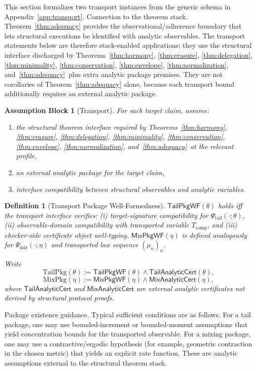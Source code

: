 \documentclass[a4paper,10pt,twocolumn,english]{article}
\numberwithin{equation}{section}
\theoremstyle{paperdef}
\newtheorem{definition}{Definition}[section]
\theoremstyle{paperplain}
\theoremstyle{paperdef}
\theoremstyle{paperremark}
\theoremstyle{paperdef}
\newtheorem{assumptions}[assumption]{Assumption Block}
\newcommand{\ABHStack}{Theorems~\ref{thm:harmony}, \ref{thm:erasure}, \ref{thm:delegation}, \ref{thm:minimality}, \ref{thm:conservation}, \ref{thm:envelope}, \ref{thm:normalization}, and~\ref{thm:adequacy}}
\begin{document}
This section formalizes two transport instances from the generic schema in Appendix~\ref{app:transport}.
Connection to the theorem stack. Theorem~\ref{thm:adequacy} provides the
observational/adherence boundary that lets structural executions be identified
with analytic observables. The transport statements below are therefore
stack-enabled applications: they use the structural interface discharged by
\ABHStack\ plus extra analytic package premises.
They are not corollaries of Theorem~\ref{thm:adequacy} alone, because each
transport bound additionally requires an external analytic package.

\begin{assumptions}[Transport]
	\label{assump:p3-transport}
	For each target claim, assume:
	\begin{enumerate}
		\item the structural theorem interface required by \ABHStack\ at the relevant profile,
		\item an external analytic package for the target claim,
		\item interface compatibility between structural observables and analytic variables.
	\end{enumerate}
\end{assumptions}

\begin{definition}[Transport Package Well-Formedness]
	\label{def:p3-transport-pkg-wf}
	$\mathsf{TailPkgWF}(\theta)$ holds iff the transport interface verifies:
	(i) target-signature compatibility for $\Psi_{\mathrm{tail}}(\cdot;\theta)$,
	(ii) observable-domain compatibility with transported variable
	$T_{\mathrm{comp}}$, and (iii) checker-side certificate object well-typing.
	$\mathsf{MixPkgWF}(\eta)$ is defined analogously for
	$\Psi_{\mathrm{mix}}(\cdot;\eta)$ and transported law sequence $(\mu_n)_n$.

	Write
	\[
		\mathrm{TailPkg}(\theta) := \mathsf{TailPkgWF}(\theta)\land \mathsf{TailAnalyticCert}(\theta),
	\]
	\[
		\mathrm{MixPkg}(\eta) := \mathsf{MixPkgWF}(\eta)\land \mathsf{MixAnalyticCert}(\eta),
	\]
	where $\mathsf{TailAnalyticCert}$ and $\mathsf{MixAnalyticCert}$ are external
	analytic certificates not derived by structural protocol proofs.
\end{definition}

Package existence guidance. Typical sufficient conditions are as follows.
For a tail package, one may use bounded-increment or bounded-moment
assumptions that yield concentration bounds for the transported observable.
For a mixing package, one may use a contractive/ergodic hypothesis (for
example, geometric contraction in the chosen metric) that yields an explicit
rate function. These are analytic assumptions external to the structural theorem
stack.
\end{document}
